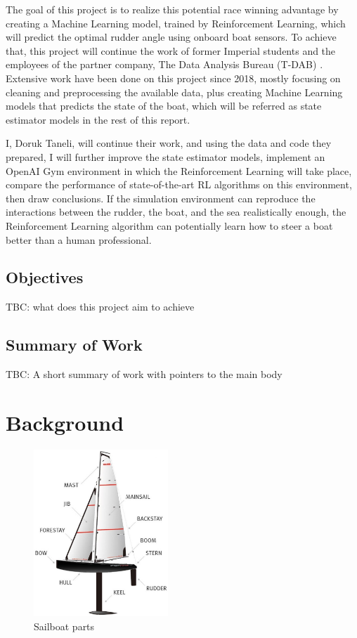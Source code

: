 \documentclass[12pt,twoside]{report}
\begin{document}
The goal of this project is to realize this potential race winning advantage by creating a Machine Learning model, trained by Reinforcement Learning, which will predict the optimal rudder angle using onboard boat sensors. To achieve that, this project will continue the work of former Imperial students and the employees of the partner company, The Data Analysis Bureau (T-DAB) \cite{t-dab}. Extensive work have been done on this project since 2018, mostly focusing on cleaning and preprocessing the available data, plus creating Machine Learning models that predicts the state of the boat, which will be referred as state estimator models in the rest of this report.

I, Doruk Taneli, will continue their work, and using the data and code they prepared, I will further improve the state estimator models, implement an OpenAI Gym environment in which the Reinforcement Learning will take place, compare the performance of state-of-the-art RL algorithms on this environment, then draw conclusions. If the simulation environment can reproduce the interactions between the rudder, the boat, and the sea realistically enough, the Reinforcement Learning algorithm can potentially learn how to steer a boat better than a human professional.

\section{Objectives}
TBC: what does this project aim to achieve

\section{Summary of Work}
TBC: A short summary of work with pointers to the main body


\chapter{Background}

\begin{figure}
\vspace{-11cm}
\centering
\includegraphics[width = 0.45\textwidth]{figures/sailing/sailboat-parts.png}
\caption{Sailboat parts \cite{sail-parts}}
\label{fig:sail-parts}
\end{figure}
\end{document}

